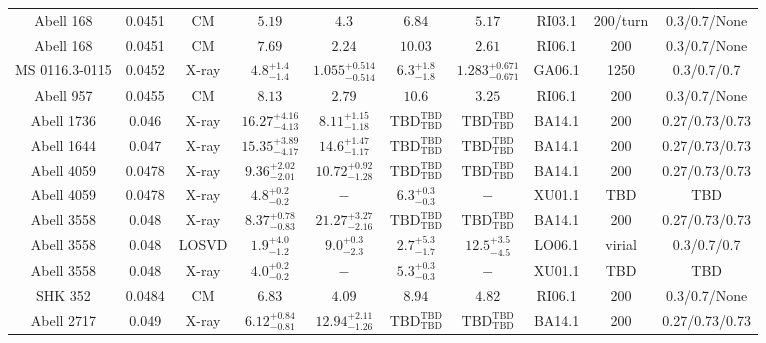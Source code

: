 \begin{table}
\begin{tabular}{cccccccccc}
Abell 168 & 0.0451 & CM & ${5.19}^{}_{}$ & ${4.3}^{}_{}$ & ${6.84}^{}_{}$ & ${5.17}^{}_{}$ & RI03.1 & 200/turn & 0.3/0.7/None \\
Abell 168 & 0.0451 & CM & ${7.69}^{}_{}$ & ${2.24}^{}_{}$ & ${10.03}^{}_{}$ & ${2.61}^{}_{}$ & RI06.1 & 200 & 0.3/0.7/None \\
MS 0116.3-0115 & 0.0452 & X-ray & ${4.8}^{+1.4}_{-1.4}$ & ${1.055}^{+0.514}_{-0.514}$ & ${6.3}^{+1.8}_{-1.8}$ & ${1.283}^{+0.671}_{-0.671}$ & GA06.1 & 1250 & 0.3/0.7/0.7 \\
Abell 957 & 0.0455 & CM & ${8.13}^{}_{}$ & ${2.79}^{}_{}$ & ${10.6}^{}_{}$ & ${3.25}^{}_{}$ & RI06.1 & 200 & 0.3/0.7/None \\
Abell 1736 & 0.046 & X-ray & ${16.27}^{+4.16}_{-4.13}$ & ${8.11}^{+1.15}_{-1.18}$ & ${\mathrm{TBD}}^{\mathrm{TBD}}_{\mathrm{TBD}}$ & ${\mathrm{TBD}}^{\mathrm{TBD}}_{\mathrm{TBD}}$ & BA14.1 & 200 & 0.27/0.73/0.73 \\
Abell 1644 & 0.047 & X-ray & ${15.35}^{+3.89}_{-4.17}$ & ${14.6}^{+1.47}_{-1.17}$ & ${\mathrm{TBD}}^{\mathrm{TBD}}_{\mathrm{TBD}}$ & ${\mathrm{TBD}}^{\mathrm{TBD}}_{\mathrm{TBD}}$ & BA14.1 & 200 & 0.27/0.73/0.73 \\
Abell 4059 & 0.0478 & X-ray & ${9.36}^{+2.02}_{-2.01}$ & ${10.72}^{+0.92}_{-1.28}$ & ${\mathrm{TBD}}^{\mathrm{TBD}}_{\mathrm{TBD}}$ & ${\mathrm{TBD}}^{\mathrm{TBD}}_{\mathrm{TBD}}$ & BA14.1 & 200 & 0.27/0.73/0.73 \\
Abell 4059 & 0.0478 & X-ray & ${4.8}^{+0.2}_{-0.2}$ & ${-}^{}_{}$ & ${6.3}^{+0.3}_{-0.3}$ & ${-}^{}_{}$ & XU01.1 & TBD & TBD \\
Abell 3558 & 0.048 & X-ray & ${8.37}^{+0.78}_{-0.83}$ & ${21.27}^{+3.27}_{-2.16}$ & ${\mathrm{TBD}}^{\mathrm{TBD}}_{\mathrm{TBD}}$ & ${\mathrm{TBD}}^{\mathrm{TBD}}_{\mathrm{TBD}}$ & BA14.1 & 200 & 0.27/0.73/0.73 \\
Abell 3558 & 0.048 & LOSVD & ${1.9}^{+4.0}_{-1.2}$ & ${9.0}^{+0.3}_{-2.3}$ & ${2.7}^{+5.3}_{-1.7}$ & ${12.5}^{+3.5}_{-4.5}$ & LO06.1 & virial & 0.3/0.7/0.7 \\
Abell 3558 & 0.048 & X-ray & ${4.0}^{+0.2}_{-0.2}$ & ${-}^{}_{}$ & ${5.3}^{+0.3}_{-0.3}$ & ${-}^{}_{}$ & XU01.1 & TBD & TBD \\
SHK 352 & 0.0484 & CM & ${6.83}^{}_{}$ & ${4.09}^{}_{}$ & ${8.94}^{}_{}$ & ${4.82}^{}_{}$ & RI06.1 & 200 & 0.3/0.7/None \\
Abell 2717 & 0.049 & X-ray & ${6.12}^{+0.84}_{-0.81}$ & ${12.94}^{+2.11}_{-1.26}$ & ${\mathrm{TBD}}^{\mathrm{TBD}}_{\mathrm{TBD}}$ & ${\mathrm{TBD}}^{\mathrm{TBD}}_{\mathrm{TBD}}$ & BA14.1 & 200 & 0.27/0.73/0.73 \\

\end{tabular}
\end{table}
